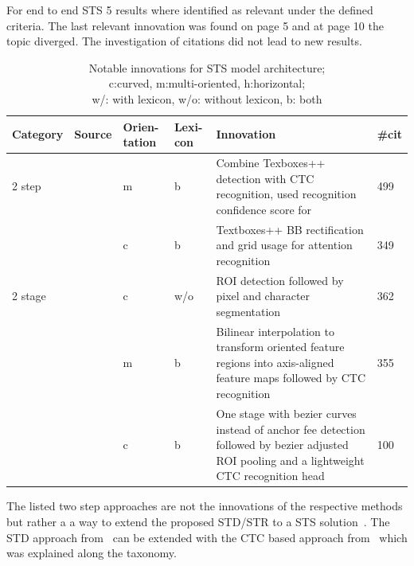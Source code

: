 For end to end \ac{STS} 5 results where identified as relevant under the defined criteria.
The last relevant innovation was found on page 5 and at page 10 the topic diverged.
The investigation of citations did not lead to new results.
\begin{table}[h]
    \centering\scriptsize
    \begin{tabular}{p{}p{}p{}p{}
            p{}p{}}
        Category & Source & Orien-tation & Lexi-con & Innovation & \#cit\\
        \toprule
        2 step &~\cite{liao_textboxes_2018} & m & b & Combine Texboxes++ detection with \ac{CTC}
            recognition, used recognition confidence score for & 499\\
            &~\cite{shi_aster_2019} & c & b & Textboxes++ \ac{BB} rectification and grid usage for
                attention recognition & 349 \\
        2 stage &~\cite{lyu_mask_2018} & c & w/o & \ac{ROI} detection followed by pixel and character
            segmentation & 362 \\
            &~\cite{liu_fots_2018} & m & b & Bilinear interpolation to transform oriented feature
                regions into axis-aligned feature maps followed by \ac{CTC} recognition & 355 \\
            &~\cite{liu_abcnet_2020} & c & b & One stage with bezier curves instead of anchor fee
                detection followed by bezier adjusted ROI pooling and a lightweight \ac{CTC}
                recognition head & 100 \\
        \bottomrule
    \end{tabular}
    \captionsetup{justification=centering}
    \caption[Notable innovations for STS model architecture]{%
        Notable innovations for STS model architecture; \\
        c:curved, m:multi-oriented, h:horizontal; \\
        w/: with lexicon, w/o: without lexicon, b: both\label{tb:E2E-steps-properties}
    }
\end{table}
The listed two step approaches are not the innovations of the respective methods but rather a
a way to extend the proposed \ac{STD}/\ac{STR} to a \ac{STS}
solution~\citep{liao_textboxes_2018,shi_aster_2019}.
The \ac{STD} approach from~\cite{liao_textboxes_2018} can be extended with the \ac{CTC} based
approach from~\cite{shi_end--end_2017} which was explained along the taxonomy.
